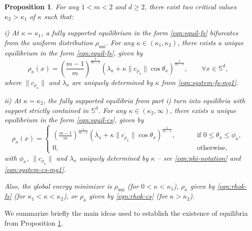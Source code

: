 \documentclass[11pt]{amsart}
\newtheorem{proposition}{Proposition}[section]
\newcommand{\bbs}{\mathbb S}
\newcommand{\rhou}{\rho_{\mathrm{uni}}}
\newcommand{\dm}{d} %
\begin{document}
\begin{proposition} \cite[Proposition 4.1 \& Theorem 4.1]{FePaVa2025}
\label{prop:bif-mg1}
For any $1<m<2$ and $\dm\geq 2$, there exist two critical values $\kappa_2>\kappa_1$ of $\kappa$ such that:

\noindent i) At $\kappa=\kappa_1$, a fully supported equilibrium in the form \eqref{eqn:equil-fs} bifurcates from the uniform distribution $\rhou$. For any $\kappa \in (\kappa_1,\kappa_2)$, there exists a unique equilibrium in the form \eqref{eqn:equil-fs}, given by
\begin{equation}
\label{eqn:rhok-fs}
\rho_\kappa(x)=\left(\frac{m-1}{m}\right)^{\frac{1}{m-1}}\left(\lambda_\kappa+\kappa \|c_{\rho_\kappa}\| \cos\theta_x\right)^{\frac{1}{m-1}},\qquad\forall x\in \bbs^\dm,
\end{equation}
where $\|c_{\rho_\kappa}\|$ and $\lambda_\kappa$ are uniquely determined by $\kappa$ from  \eqref{eqn:system-fs-mg1}. 
\smallskip

\noindent ii) At $\kappa=\kappa_2$, the fully supported equilibria from part i) turn into equilibria with support strictly contained in $\bbs^\dm$.  For any $\kappa \in (\kappa_2,\infty)$, there exists a unique equilibrium in the form \eqref{eqn:equil-cs}, given by
\begin{equation}
\label{eqn:rhok-cs}
\rho_\kappa(x)=\begin{cases}
\left(\frac{m-1}{m}\right)^{\frac{1}{m-1}}\left(\lambda_\kappa+\kappa \|c_{\rho_\kappa}\| \cos\theta_x\right)^{\frac{1}{m-1}},\qquad&\text{ if }0\leq\theta_x\leq \phi_\kappa, \\[5pt]
0,\qquad&\text{ otherwise},
\end{cases} 
\end{equation}
with $\phi_\kappa$, $\|c_{\rho_\kappa}\|$ and $\lambda_\kappa$ uniquely determined by $\kappa$ -- see \eqref{eqn:phi-notation} and \eqref{eqn:system-cs-mg1}.

Also, the global energy minimizer is $\rhou$ (for $0<\kappa<\kappa_1$), $\rho_\kappa$ given by \eqref{eqn:rhok-fs} (for $\kappa_1<\kappa<\kappa_2$), or $\rho_\kappa$ given by \eqref{eqn:rhok-cs} (for $\kappa>\kappa_2$).
\end{proposition}

We summarize briefly the main ideas used to establish the existence of equilibria from Proposition \ref{prop:bif-mg1}.
\end{document}
